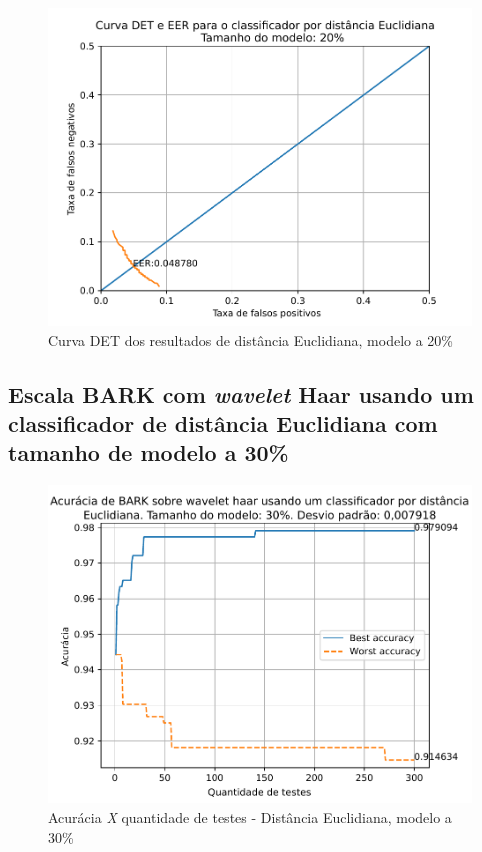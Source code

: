 			\begin{figure}[!ht]
				\centering
				\includegraphics[width=.6\linewidth]{images/results/det/DET_for_classifier_Euclidian_20}
				\caption{Curva DET dos resultados de distância Euclidiana, modelo a 20\%}
				\label{fig:detforclassifiereuclidian20}
			\end{figure}

			\FloatBarrier
		\subsection{Escala BARK com \textit{wavelet} Haar usando um classificador de distância Euclidiana com tamanho de modelo a 30\%}
		
			
		
			\begin{figure}[ht]
				\centering
				\includegraphics[width=.6\linewidth]{images/results/confusionMatrices/classifier_Euclidian_30}
				\caption{Acurácia \textit{X} quantidade de testes - Distância Euclidiana, modelo a 30\%}
				\label{fig:classifiereuclidian30}
			\end{figure}
		
